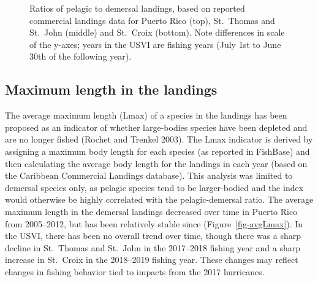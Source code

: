 \documentclass[
  letterpaper,
  oneside,
  open=any]{scrbook}
\begin{document}
\begin{figure}


\caption{\label{fig-PD}Ratios of pelagic to demersal landings, based on
reported commercial landings data for Puerto Rico (top), St.~Thomas and
St.~John (middle) and St.~Croix (bottom). Note differences in scale of
the y-axes; years in the USVI are fishing years (July 1st to June 30th
of the following year).}

\end{figure}%

\subsection{Maximum length in the
landings}\label{maximum-length-in-the-landings}

The average maximum length (Lmax) of a species in the landings has been
proposed as an indicator of whether large-bodies species have been
depleted and are no longer fished (Rochet and Trenkel 2003). The Lmax
indicator is derived by assigning a maximum body length for each species
(as reported in FishBase) and then calculating the average body length
for the landings in each year (based on the Caribbean Commercial
Landings database). This analysis was limited to demersal species only,
as pelagic species tend to be larger-bodied and the index would
otherwise be highly correlated with the pelagic-demersal ratio. The
average maximum length in the demersal landings decreased over time in
Puerto Rico from 2005--2012, but has been relatively stable since
(Figure~\ref{fig-avgLmax}). In the USVI, there has been no overall trend
over time, though there was a sharp decline in St.~Thomas and St.~John
in the 2017--2018 fishing year and a sharp increase in St.~Croix in the
2018--2019 fishing year. These changes may reflect changes in fishing
behavior tied to impacts from the 2017 hurricanes.
\end{document}
